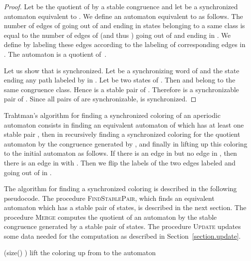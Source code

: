 \documentclass[11pt,a4paper]{article}
\begin{document}
\begin{proof}
  Let  be the quotient of  by a stable congruence and let
   be a synchronized automaton equivalent to .  We define an
  automaton  equivalent to  as follows. The number of edges
  of  going out of  and ending in states belonging to a same
  class  is equal to the number of edges of  (and thus
  ) going out of  and ending in . We define
   by labeling these edges according to the labeling of
  corresponding edges in . The automaton  is a quotient
  of~.
 


  Let us show that  is synchronized. Let  be a synchronizing
  word of  and  the state ending any path labeled by  in
  . Let  be two states of .  Then  and  belong to the same congruence class. Hence  is a stable pair of . Therefore  is a
  synchronizable pair of . Since all pairs of  are
  synchronizable,  is synchronized.
\end{proof}

Trahtman's algorithm for finding a synchronized coloring of an
aperiodic automaton  consists in finding an equivalent automaton
 of  which has at least one stable pair , then in
recursively finding a synchronized coloring  for the quotient
automaton  by the congruence generated by , and finally in
lifting up this coloring to the initial automaton as follows. If there
is an edge  in  but no edge 
in , then there is an edge  in  with
. Then we flip the labels of the two edges labeled 
and  going out of  in .

The algorithm for finding a synchronized coloring is described in the
following pseudocode.  The procedure \textsc{FindStablePair}, which
finds an equivalent automaton which has a stable pair of states, is
described in the next section. The procedure \textsc{Merge} computes
the quotient of an automaton by the stable congruence generated by a
stable pair of states.  The procedure \textsc{Update} updates some
data needed for the computation as described in
Section~\ref{section.update}.

\begin{small}
\begin{codebox}
\Procname{} 
\li  
\li  \While (size() ) 
\li      \Do {}
\li        {}
\li       lift the coloring up from  to the automaton  
\li        {}
  \End
\li \Return  
\end{codebox}
\end{small}
\end{document}
